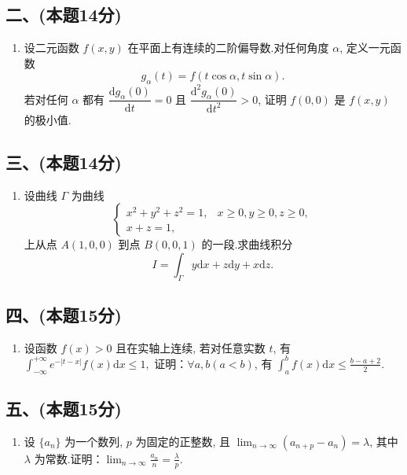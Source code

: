\subsection*{二、(本题14分)}
\begin{enumerate}[start=7]
    \item 设二元函数 $f(x,  y)$ 在平面上有连续的二阶偏导数.对任何角度 $\alpha$,  定义一元函数
          \[
              g_\alpha(t) = f(t \cos \alpha,  t \sin \alpha).
          \]
          若对任何 $\alpha$ 都有 $\dfrac{\mathrm{d} g_\alpha(0)}{\mathrm{d} t} = 0$ 且 $\dfrac{\mathrm{d}^2 g_\alpha(0)}{\mathrm{d} t^2} > 0$,  证明 $f(0, 0)$ 是 $f(x,  y)$ 的极小值.
\end{enumerate}

\subsection*{三、(本题14分)}
\begin{enumerate}[start=8]
    \item 设曲线 $\Gamma$ 为曲线
          \[
              \begin{cases}
                  x^2 + y^2 + z^2 = 1, & x \geqslant 0,  y \geqslant 0,  z \geqslant 0, \\
                  x + z = 1,
              \end{cases}
          \]
          上从点 $A(1, 0, 0)$ 到点 $B(0, 0, 1)$ 的一段.求曲线积分
          \[
              I = \int_{\Gamma} y  \mathrm{d}x + z  \mathrm{d}y + x  \mathrm{d}z.
          \]
\end{enumerate}

\subsection*{四、(本题15分)}
\begin{enumerate}[start=9]
    \item 设函数 $f(x) > 0$ 且在实轴上连续,  若对任意实数 $t$,  有
          $\displaystyle\int_{-\infty}^{+\infty} e^{-|t-x|} f(x)  \mathrm{d}x \leqslant 1,  $
          证明：$\forall a,  b (a < b)$,  有 $\displaystyle\int_a^b f(x)  \mathrm{d}x \leqslant \frac{b - a + 2}{2}$.
\end{enumerate}

\subsection*{五、(本题15分)}
\begin{enumerate}[start=10]
    \item 设 $\{a_n\}$ 为一个数列,  $p$ 为固定的正整数,  且 $\displaystyle\lim_{n \to \infty} (a_{n+p} - a_n) = \lambda$,  其中 $\lambda$ 为常数.证明：$\displaystyle\lim_{n \to \infty} \frac{a_n}{n} = \frac{\lambda}{p}$.
\end{enumerate}



